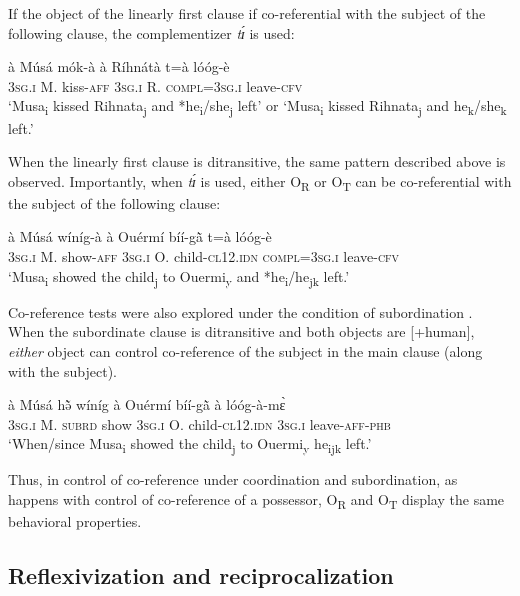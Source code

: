 \documentclass[output=paper]{langsci/langscibook}
\begin{document}
If the object of the linearly first clause if co-referential with the subject of the following clause, the complementizer \textit{tɪ́} is used:

\ea
\label{ex:38.pacchiarotti}
\gll à    Músá  mók-à    à    Ríhnátà  t=à        lóóg-è\\
\textsc{3sg.i}    M.  kiss-\textsc{aff}  \textsc{3sg.i}    R.    \textsc{compl=3sg.i}      leave-\textsc{cfv}\\
\glt `Musa\textsubscript{i} kissed Rihnata\textsubscript{j} and *he\textsubscript{i}/she\textsubscript{j} left' or `Musa\textsubscript{i} kissed Rihnata\textsubscript{j} and he\textsubscript{k}/she\textsubscript{k} left.'
\z

When the linearly first clause is ditransitive, the same pattern described above is observed. Importantly, when \textit{tɪ́} is used, either O\textsubscript{R} or O\textsubscript{T} can be co-referential with the subject of the following clause:

\ea
\label{ex:39.pacchiarotti}
\gll à    Músá  wíníg-à  à    Ouérmí  bíí-g\`{ã}  t=à      lóóg-è \\     
\textsc{3sg.i}    M.  show-\textsc{aff}  \textsc{3sg.i}    O.    child-\textsc{cl12.idn} \textsc{  compl=3sg.i}        leave-\textsc{cfv}\\
\glt `Musa\textsubscript{i}  showed the child\textsubscript{j} to Ouermi\textsubscript{y} and *he\textsubscript{i}/he\textsubscript{jk} left.'
\z

Co-reference tests were also explored under the condition of subordination . When the subordinate clause is ditransitive and both objects are [+human], \textit{either} object can control co-reference of the subject in the main clause (along with the subject).

\ea
\label{ex:40.pacchiarotti}
\gll à Músá hə̃̀ wíníg à Ouérmí bíí-g\`{ã} à lóóg-à-mɛ̀\\
\textsc{3sg.i}    M.  \textsc{subrd}    show  \textsc{3sg.i}    O.        child-\textsc{cl12.idn} \textsc{3sg.i}    leave-\textsc{aff-phb}\\
\glt `When/since Musa\textsubscript{i} showed the child\textsubscript{j} to Ouermi\textsubscript{y} he\textsubscript{ijk} left.'
\z

Thus, in control of co-reference under coordination and subordination, as happens with control of co-reference of a possessor, O\textsubscript{R} and O\textsubscript{T} display the same behavioral properties. 

\subsection{Reflexivization and reciprocalization}\label{§5.4:reflexivization.pacchiarotti}
\end{document}
